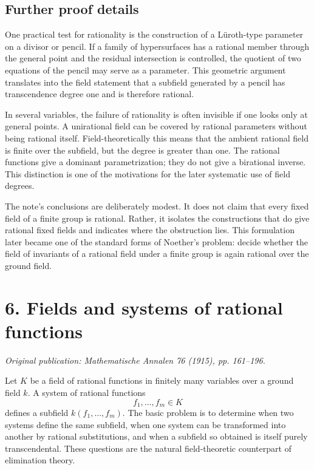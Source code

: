 \documentclass[12pt]{article}
\begin{document}
\subsection{Further proof details}

One practical test for rationality is the construction of a Lüroth-type parameter on a divisor or
pencil. If a family of hypersurfaces has a rational member through the general point and the
residual intersection is controlled, the quotient of two equations of the pencil may serve as a
parameter. This geometric argument translates into the field statement that a subfield generated by
a pencil has transcendence degree one and is therefore rational.

In several variables, the failure of rationality is often invisible if one looks only at general
points. A unirational field can be covered by rational parameters without being rational itself.
Field-theoretically this means that the ambient rational field is finite over the subfield, but the
degree is greater than one. The rational functions give a dominant parametrization; they do not give
a birational inverse. This distinction is one of the motivations for the later systematic use of
field degrees.

The note's conclusions are deliberately modest. It does not claim that every fixed field of a finite
group is rational. Rather, it isolates the constructions that do give rational fixed fields and
indicates where the obstruction lies. This formulation later became one of the standard forms of
Noether's problem: decide whether the field of invariants of a rational field under a finite group
is again rational over the ground field.


\section{6. Fields and systems of rational functions}

\textit{Original publication: Mathematische Annalen 76 (1915), pp. 161--196.}

Let \(K\) be a field of rational functions in finitely many variables over a ground field \(k\). A
system of rational functions \[   f_1,\ldots,f_m\in K \] defines a subfield \(k(f_1, \ldots,f_m)\).
The basic problem is to determine when two systems define the same subfield, when one system can be
transformed into another by rational substitutions, and when a subfield so obtained is itself purely
transcendental. These questions are the natural field-theoretic counterpart of elimination theory.
\end{document}
